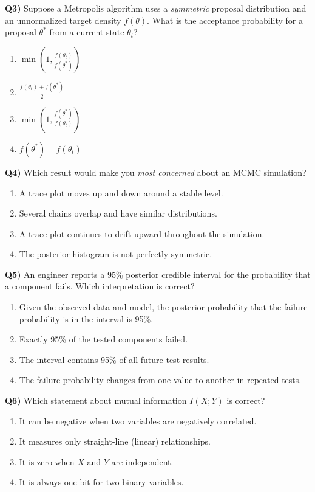 \documentclass[12pt]{article}
\newcommand{\question}[2]{\vspace{0.7em}\noindent\textbf{Q#1)}}
\begin{document}
\question{3}{}
Suppose a Metropolis algorithm uses a \emph{symmetric} proposal distribution and an unnormalized target density $f(\theta)$. What is the acceptance probability for a proposal $\theta^*$ from a current state $\theta_t$?
\begin{enumerate}[label=\Alph*.]
\item $\displaystyle \min\!\left(1,\frac{f(\theta_t)}{f(\theta^*)}\right)$
\item $\displaystyle \frac{f(\theta_t)+f(\theta^*)}{2}$
\item $\displaystyle \min\!\left(1,\frac{f(\theta^*)}{f(\theta_t)}\right)$
\item $\displaystyle f(\theta^*)-f(\theta_t)$
\end{enumerate}

\question{4}{}
Which result would make you \emph{most concerned} about an MCMC simulation?
\begin{enumerate}[label=\Alph*.]
\item A trace plot moves up and down around a stable level.
\item Several chains overlap and have similar distributions.
\item A trace plot continues to drift upward throughout the simulation.
\item The posterior histogram is not perfectly symmetric.
\end{enumerate}

\question{5}{}
An engineer reports a 95\% posterior credible interval for the probability that a component fails. Which interpretation is correct?
\begin{enumerate}[label=\Alph*.]
\item Given the observed data and model, the posterior probability that the failure probability is in the interval is 95\%.
\item Exactly 95\% of the tested components failed.
\item The interval contains 95\% of all future test results.
\item The failure probability changes from one value to another in repeated tests.
\end{enumerate}

\question{6}{}
Which statement about mutual information $I(X;Y)$ is correct?
\begin{enumerate}[label=\Alph*.]
\item It can be negative when two variables are negatively correlated.
\item It measures only straight-line (linear) relationships.
\item It is zero when $X$ and $Y$ are independent.
\item It is always one bit for two binary variables.
\end{enumerate}
\end{document}
